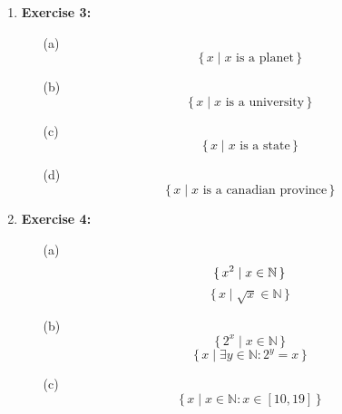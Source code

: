 \documentclass{article} %
\newcommand\Set[2]{\{\,#1\mid#2\,\}}
\newcommand\SET[2]{\Set{#1}{\text{#2}}}
\begin{document}
\begin{enumerate}
        \item \textbf{Exercise 3:}
        \begin{itemize}
            \item[(a)] 
            \begin{equation}
                \SET{x}{$x$ is a planet}
            \end{equation}
            \item[(b)] 
            \begin{equation}
                \SET{x}{$x$ is a university}
            \end{equation}
            \item[(c)] 
            \begin{equation}
                \SET{x}{$x$ is a state}
            \end{equation}
            \item[(d)] 
            \begin{equation}
                \SET{x}{$x$ is a canadian province}
            \end{equation}
        \end{itemize}

        \item \textbf{Exercise 4:}
        \begin{itemize}
            \item[(a)] 
            \begin{equation*}
                \Set{x^2}{x \in \mathbb{N}} \\
            \end{equation*}
            \begin{equation*}
                \Set{x}{\sqrt{x} \in \mathbb{N}}
            \end{equation*}
            \item[(b)]
            \begin{equation*}
                \Set{2^x}{x \in \mathbb{N}}
            \end{equation*}
            \begin{equation*}
                \Set{x}{\exists y \in \mathbb{N} : 2^y = x} 
            \end{equation*}
            \item[(c)]
            \begin{equation*}
                \Set{x}{x \in \mathbb{N} : x \in [10, 19]}
            \end{equation*}
        \end{itemize}


\end{enumerate}
\end{document}
